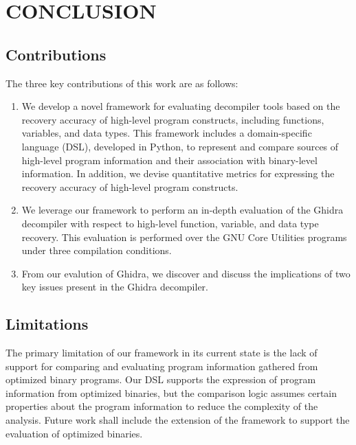 \documentclass[a4paper,twoside]{article}
\begin{document}

\section{\uppercase{Conclusion}} \label{sec:conclusion}

\subsection{Contributions}

The three key contributions of this work are as follows:
\begin{enumerate}
    \item We develop a novel framework for evaluating decompiler tools based on the recovery accuracy of high-level program constructs, including functions, variables, and data types. This framework includes a domain-specific language (DSL), developed in Python, to represent and compare sources of high-level program information and their association with binary-level information. In addition, we devise quantitative metrics for expressing the recovery accuracy of high-level program constructs.
    \item We leverage our framework to perform an in-depth evaluation of the Ghidra decompiler with respect to high-level function, variable, and data type recovery. This evaluation is performed over the GNU Core Utilities programs under three compilation conditions.
    \item From our evalution of Ghidra, we discover and discuss the implications of two key issues present in the Ghidra decompiler.
\end{enumerate}

\subsection{Limitations}

The primary limitation of our framework in its current state is the lack of support for comparing and evaluating program information gathered from optimized binary programs. Our DSL supports the expression of program information from optimized binaries, but the comparison logic assumes certain properties about the program information to reduce the complexity of the analysis. Future work shall include the extension of the framework to support the evaluation of optimized binaries.
\end{document}
